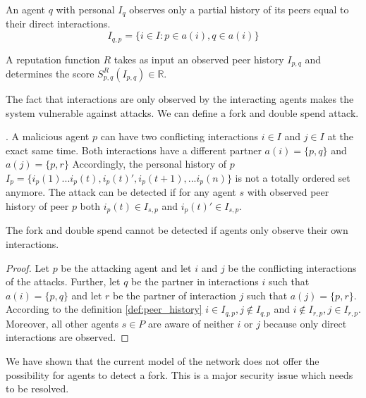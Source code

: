 \begin{defn} 
    \label{def:peer_history}
    An agent $q$ with personal $I_q$ observes only a partial history
    of its peers equal to their direct interactions.
    \[ I_{q,p} = \{ i \in I : p \in a(i), q \in a(i) \}\]
\end{defn}

\begin{defn} 
    A reputation function $R$ takes as input an observed peer history $I_{p,q}$ and determines the score $S^R_{p,q}(I_{p,q}) \in \mathbb{R}$.
\end{defn}

The fact that interactions are only observed by the interacting agents makes the system vulnerable
against attacks. We can define a fork and double spend attack. 

\begin{defn}. A malicious agent $p$ can have two conflicting interactions 
    $i \in I$ and $j \in I$ at the exact same time. Both interactions have a different partner $a(i) = \{p, q\}$ 
    and $a(j) = \{p, r\}$ Accordingly, the personal history of $p$ $I_p = \{i_p(1) ... i_p(t), i_p(t)', i_p(t+1), ... i_p(n)\}$ is not a totally ordered set anymore.
    The attack can be detected if for any agent $s$ with observed peer history of peer $p$ both 
    $i_p(t) \in I_{s,p}$ and $i_p(t)' \in I_{s,p}$.
\end{defn}

\begin{thm} 
    The fork and double spend cannot be detected if agents only observe their own interactions.
\end{thm}
\begin{proof}
    Let $p$ be the attacking agent and let $i$ and $j$ be the conflicting interactions of the attacks.
    Further, let $q$ be the partner in interactions $i$ such that $a(i) = \{p, q\}$ and let $r$ be
    the partner of interaction $j$ such that $a(j) = \{p, r\}$. According to the definition 
    \ref{def:peer_history} $i \in I_{q, p}, j \notin I_{q, p}$ and $i \notin I_{r, p}, j \in I_{r, p}$.
    Moreover, all other agents $s \in P$ are aware of neither $i$ or $j$ because only direct 
    interactions are observed.
\end{proof}

We have shown that the current model of the network does not offer the possibility for agents to 
detect a fork. This is a major security issue which needs to be resolved. 

